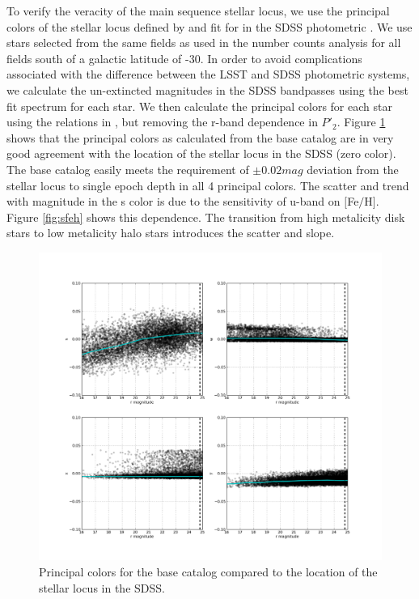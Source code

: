 \documentclass[]{article}
\begin{document}
{To verify the veracity of the main sequence stellar locus, we use the principal colors of the stellar locus defined by \citet{helmi02} and 
fit for in the SDSS photometric \citet{ivezic04}.
We use stars selected from the same fields as used in the number counts analysis for all fields south of a galactic latitude of -30.
In order to avoid complications associated with the difference between the LSST and SDSS photometric systems, we calculate the un-extincted 
magnitudes in the SDSS bandpasses using the best fit spectrum for each star.  We then calculate
the principal colors for each star using the relations in \citet{ivezic04}, but removing the r-band dependence in $P\prime_{2}$.  Figure
\ref{fig:principalcolors} shows that the principal colors as calculated from the base catalog are in very good agreement with
the location of the stellar locus in the SDSS (zero color).  The base catalog easily meets the requirement of $\pm0.02mag$ deviation
from the stellar locus to single epoch depth in all 4 principal colors.  The scatter and trend with magnitude in the s color is due to 
the sensitivity of u-band on $[$Fe$/$H$]$.  Figure \ref{fig:sfeh} shows this dependence.  The transition from high metalicity disk stars to low 
metalicity halo stars introduces the scatter and slope.
\begin{figure}[H]
\centering
\includegraphics[width=5in]{validation_figures/principal_colors_vr.png}
\caption{Principal colors for the base catalog compared to the location of the stellar locus in the SDSS.\label{fig:principalcolors}}
\end{figure}

}
\end{document}
